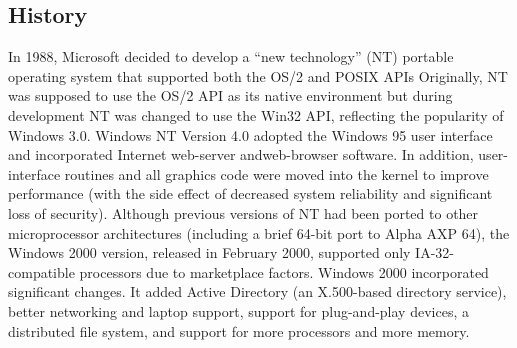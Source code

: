 \documentclass[12pt]{article}
\begin{document}
\subsection*{History}
In 1988, Microsoft decided to develop a “new technology” (NT) portable operating system that supported both the OS/2 and POSIX APIs
Originally, NT was supposed to use the OS/2 API as its native environment but during development NT was changed to use the Win32 API, reflecting the popularity of Windows 3.0. Windows NT Version 4.0 adopted the Windows 95 user interface and incorporated Internet web-server andweb-browser software. In addition, user-interface routines and
all graphics code were moved into the kernel to improve performance (with
the side effect of decreased system reliability and significant loss of security).
Although previous versions of NT had been ported to other microprocessor
architectures (including a brief 64-bit port to Alpha AXP 64), the Windows
2000 version, released in February 2000, supported only IA-32-compatible processors
due to marketplace factors. Windows 2000 incorporated significant
changes. It added Active Directory (an X.500-based directory service), better
networking and laptop support, support for plug-and-play devices, a distributed
file system, and support for more processors and more memory.
\end{document}
